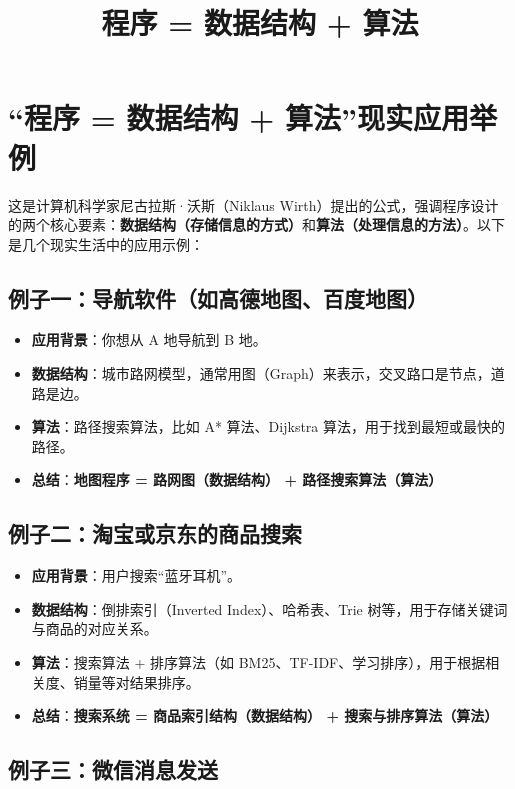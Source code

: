 \documentclass{article}
\title{程序 = 数据结构 + 算法}
\author{}
\date{}
\begin{document}
\maketitle

\section*{“程序 = 数据结构 + 算法”现实应用举例}

这是计算机科学家尼古拉斯·沃斯（Niklaus Wirth）提出的公式，强调程序设计的两个核心要素：\textbf{数据结构（存储信息的方式）}和\textbf{算法（处理信息的方法）}。以下是几个现实生活中的应用示例：

\subsection*{例子一：导航软件（如高德地图、百度地图）}

\begin{itemize}
    \item \textbf{应用背景}：你想从 A 地导航到 B 地。
    \item \textbf{数据结构}：城市路网模型，通常用图（Graph）来表示，交叉路口是节点，道路是边。
    \item \textbf{算法}：路径搜索算法，比如 A* 算法、Dijkstra 算法，用于找到最短或最快的路径。
    \item \textbf{总结}：\textbf{地图程序 = 路网图（数据结构） + 路径搜索算法（算法）}
\end{itemize}

\subsection*{例子二：淘宝或京东的商品搜索}

\begin{itemize}
    \item \textbf{应用背景}：用户搜索“蓝牙耳机”。
    \item \textbf{数据结构}：倒排索引（Inverted Index）、哈希表、Trie 树等，用于存储关键词与商品的对应关系。
    \item \textbf{算法}：搜索算法 + 排序算法（如 BM25、TF-IDF、学习排序），用于根据相关度、销量等对结果排序。
    \item \textbf{总结}：\textbf{搜索系统 = 商品索引结构（数据结构） + 搜索与排序算法（算法）}
\end{itemize}

\subsection*{例子三：微信消息发送}
\end{document}
